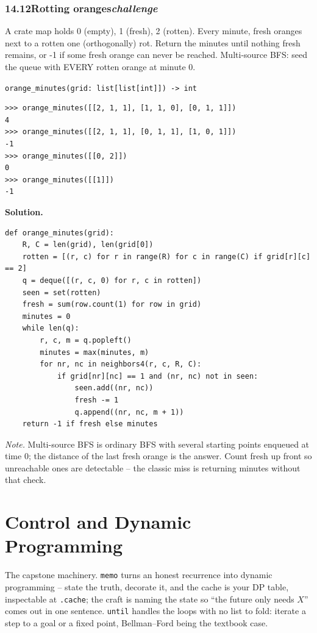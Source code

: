 \documentclass[10pt,letterpaper]{book}
\begin{document}
\subsection*{14.12\quad Rotting oranges\hfill\textnormal{\textit{challenge}}}
A crate map holds 0 (empty), 1 (fresh), 2 (rotten). Every minute, fresh oranges next to a rotten one (orthogonally) rot. Return the minutes until nothing fresh remains, or -1 if some fresh orange can never be reached. Multi-source BFS: seed the queue with EVERY rotten orange at minute 0.

\noindent\texttt{orange\_minutes(grid: list[list[int]]) -> int}
\begin{lstlisting}[style=ex]
>>> orange_minutes([[2, 1, 1], [1, 1, 0], [0, 1, 1]])
4
>>> orange_minutes([[2, 1, 1], [0, 1, 1], [1, 0, 1]])
-1
>>> orange_minutes([[0, 2]])
0
>>> orange_minutes([[1]])
-1
\end{lstlisting}
\noindent\textbf{Solution.}
\begin{lstlisting}[style=code]
def orange_minutes(grid):
    R, C = len(grid), len(grid[0])
    rotten = [(r, c) for r in range(R) for c in range(C) if grid[r][c] == 2]
    q = deque([(r, c, 0) for r, c in rotten])
    seen = set(rotten)
    fresh = sum(row.count(1) for row in grid)
    minutes = 0
    while len(q):
        r, c, m = q.popleft()
        minutes = max(minutes, m)
        for nr, nc in neighbors4(r, c, R, C):
            if grid[nr][nc] == 1 and (nr, nc) not in seen:
                seen.add((nr, nc))
                fresh -= 1
                q.append((nr, nc, m + 1))
    return -1 if fresh else minutes
\end{lstlisting}
\noindent\textit{Note.} Multi-source BFS is ordinary BFS with several starting points enqueued at time 0; the distance of the last fresh orange is the answer. Count fresh up front so unreachable ones are detectable -- the classic miss is returning minutes without that check.

\clearpage
\chapter{Control and Dynamic Programming}

The capstone machinery. \texttt{memo} turns an honest recurrence into
dynamic programming -- state the truth, decorate it, and the cache is your
DP table, inspectable at \texttt{.cache}; the craft is naming the state so
``the future only needs $X$'' comes out in one sentence. \texttt{until}
handles the loops with no list to fold: iterate a step to a goal or a fixed
point, Bellman--Ford being the textbook case.
\end{document}
